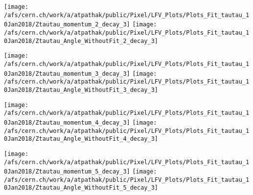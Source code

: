 \documentclass{beamer}
\begin{document}
\begin{frame}
\begin{normalsize}
\begin{center}
\texttt{[image: /afs/cern.ch/work/a/atpathak/public/Pixel/LFV\_Plots/Plots\_Fit\_tautau\_10Jan2018/Ztautau\_momentum\_2\_decay\_3]}
\texttt{[image: /afs/cern.ch/work/a/atpathak/public/Pixel/LFV\_Plots/Plots\_Fit\_tautau\_10Jan2018/Ztautau\_Angle\_WithoutFit\_2\_decay\_3]} 
\end{center}
\end{normalsize}
\end {frame}
\begin{frame}
\begin{normalsize}
\begin{center}
\texttt{[image: /afs/cern.ch/work/a/atpathak/public/Pixel/LFV\_Plots/Plots\_Fit\_tautau\_10Jan2018/Ztautau\_momentum\_3\_decay\_3]}
\texttt{[image: /afs/cern.ch/work/a/atpathak/public/Pixel/LFV\_Plots/Plots\_Fit\_tautau\_10Jan2018/Ztautau\_Angle\_WithoutFit\_3\_decay\_3]} 
\end{center}
\end{normalsize}
\end {frame}
\begin{frame}
\begin{normalsize}
\begin{center}
\texttt{[image: /afs/cern.ch/work/a/atpathak/public/Pixel/LFV\_Plots/Plots\_Fit\_tautau\_10Jan2018/Ztautau\_momentum\_4\_decay\_3]}
\texttt{[image: /afs/cern.ch/work/a/atpathak/public/Pixel/LFV\_Plots/Plots\_Fit\_tautau\_10Jan2018/Ztautau\_Angle\_WithoutFit\_4\_decay\_3]} 
\end{center}
\end{normalsize}
\end {frame}
\begin{frame}
\begin{normalsize}
\begin{center}
\texttt{[image: /afs/cern.ch/work/a/atpathak/public/Pixel/LFV\_Plots/Plots\_Fit\_tautau\_10Jan2018/Ztautau\_momentum\_5\_decay\_3]}
\texttt{[image: /afs/cern.ch/work/a/atpathak/public/Pixel/LFV\_Plots/Plots\_Fit\_tautau\_10Jan2018/Ztautau\_Angle\_WithoutFit\_5\_decay\_3]} 
\end{center}
\end{normalsize}
\end {frame}
\end{document}
